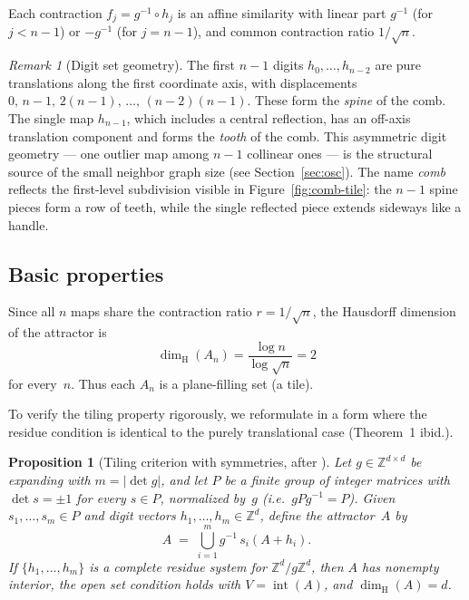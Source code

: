 \documentclass{amsart}
\newtheorem{proposition}[theorem]{Proposition}
\theoremstyle{definition}
\theoremstyle{remark}
\newtheorem{remark}[theorem]{Remark}
\newcommand{\Z}{\mathbb{Z}}
\newcommand{\dH}{\dim_{\mathrm{H}}}
\begin{document}
Each contraction $f_j = g^{-1} \circ h_j$ is an affine similarity with
linear part $g^{-1}$ (for $j < n{-}1$) or $-g^{-1}$ (for $j = n{-}1$), and
common contraction ratio $1/\sqrt{n}$.

\begin{remark}[Digit set geometry]
\label{rem:digits}
The first $n{-}1$ digits $h_0, \ldots, h_{n-2}$ are pure translations
along the first coordinate axis, with displacements
$0,\, n{-}1,\, 2(n{-}1),\, \ldots,\, (n{-}2)(n{-}1)$.  These form the
\emph{spine} of the comb.
The single map $h_{n-1}$, which includes a central reflection, has an
off-axis translation component and forms the \emph{tooth} of the comb.
This asymmetric digit geometry --- one outlier map among $n{-}1$ collinear
ones --- is the structural source of the small neighbor graph size
(see Section~\ref{sec:osc}).
The name \emph{comb} reflects the first-level subdivision visible in
Figure~\ref{fig:comb-tile}: the $n{-}1$ spine pieces form a row of
teeth, while the single reflected piece extends sideways like a handle.
\end{remark}

\subsection{Basic properties}

Since all $n$ maps share the contraction ratio $r = 1/\sqrt{n}$, the
Hausdorff dimension of the attractor is
\[
  \dH(A_n) = \frac{\log n}{\log \sqrt{n}} = 2
\]
for every~$n$.  Thus each $A_n$ is a plane-filling set (a tile).

To verify the tiling property rigorously, we reformulate
{\cite[Theorem~2]{bandt1991}} in a form where the residue condition
is identical to the purely translational case (Theorem~1 ibid.).

\begin{proposition}[Tiling criterion with symmetries,
  after {\cite[Theorem~2]{bandt1991}}]
\label{prop:bandt-sym}
Let $g \in \Z^{d \times d}$ be expanding with $m = |\det g|$,
and let $P$ be a finite group of integer matrices with
$\det s = \pm 1$ for every $s \in P$, normalized by~$g$
(i.e.\ $gPg^{-1} = P$).
Given $s_1,\ldots,s_m \in P$ and
\emph{digit vectors} $h_1,\ldots,h_m \in \Z^d$,
define the attractor~$A$ by
\begin{equation}\label{eq:ifs-sym}
  A \;=\; \bigcup_{i=1}^{m} g^{-1}\,s_i(A + h_i).
\end{equation}
If $\{h_1,\ldots,h_m\}$ is a complete residue system
for $\Z^d / g\Z^d$, then $A$ has nonempty interior,
the open set condition holds with
$V = \operatorname{int}(A)$, and $\dH(A) = d$.
\end{proposition}
\end{document}
